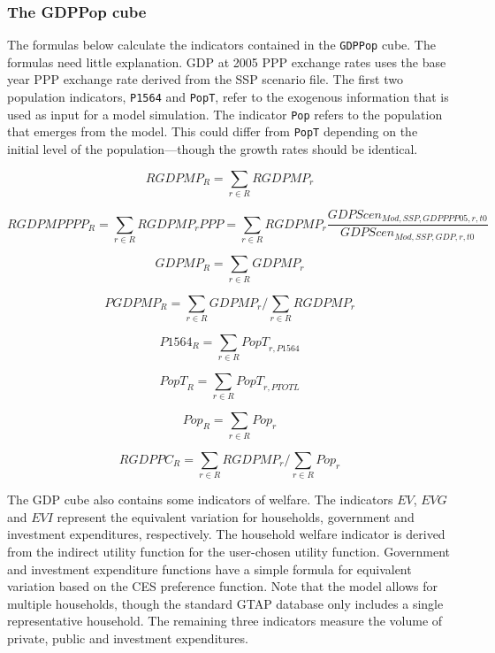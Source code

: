 \subsubsection{The GDPPop cube}

The formulas below calculate the indicators contained in the \texttt{GDPPop} cube. The
formulas need little explanation. GDP at 2005 PPP exchange rates uses the base year
PPP exchange rate derived from the SSP scenario file. The first two population indicators, \texttt{P1564}
and \texttt{PopT}, refer to the exogenous information that is used as input for
a model simulation. The indicator \texttt{Pop} refers to the population that
emerges from the model. This could differ from \texttt{PopT} depending on the
initial level of the population---though the growth rates should be identical.

\[
\mathit{RGDPMP}_R = \sum_{r \in R} {\mathit{RGDPMP}_r}
\]

\[
\mathit{RGDPMPPPP}_R = \sum_{r \in R} {\mathit{RGDPMP}_r \mathit{PPP}}
=\sum_{r \in R} {\mathit{RGDPMP}_r
	\frac{\mathit{GDPScen}_{\mathit{Mod},\mathit{SSP},\mathit{GDPPPP05},r,t0}}{\mathit{GDPScen}_{\mathit{Mod},\mathit{SSP},\mathit{GDP},r,t0}} }
\]

\[
\mathit{GDPMP}_R = \sum_{r \in R} {\mathit{GDPMP}_r}
\]

\[
\mathit{PGDPMP}_R = \sum_{r \in R} {\mathit{GDPMP}_r} \bigg/ \sum_{r \in R} {\mathit{RGDPMP}_r}
\]

\[
\mathit{P1564}_R = \sum_{r \in R} {\mathit{PopT}_{r,\mathit{P1564}}}
\]

\[
\mathit{PopT}_R = \sum_{r \in R} {\mathit{PopT}_{r,\mathit{PTOTL}}}
\]

\[
\mathit{Pop}_R = \sum_{r \in R} {\mathit{Pop}_{r}}
\]

\[
\mathit{RGDPPC}_R = \sum_{r \in R} {\mathit{RGDPMP}_r} \bigg/ \sum_{r \in R} {\mathit{Pop}_{r}}
\]

The GDP cube also contains some indicators of welfare.
The indicators $\mathit{EV}$, $\mathit{EVG}$ and $\mathit{EVI}$
represent the equivalent variation for households, government and
investment expenditures, respectively. The household welfare indicator
is derived from the indirect utility function for the user-chosen
utility function. Government and investment expenditure functions have
a simple formula for equivalent variation based on the CES preference function.
Note that the model
allows for multiple households, though the standard GTAP database only
includes a single representative household.
The remaining three indicators measure the volume of private,
public and investment expenditures.

